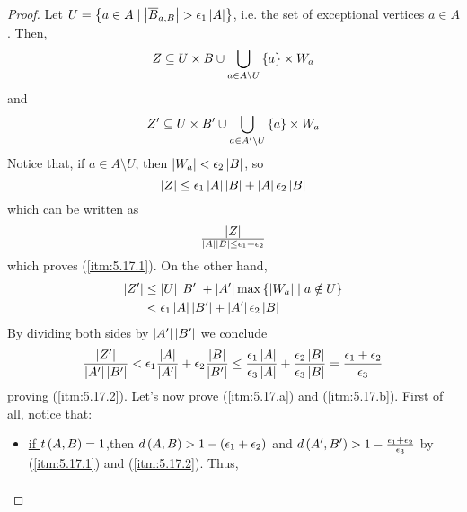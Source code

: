         \begin{proof}
            Let $U = \left\{ a \in A \mid \left| \overline{B}_{a,B} \right| > \epsilon_1 \left| A \right| \right\}$, i.e. the set
            of exceptional vertices $a \in A$.
            Then,
            \[
                Z \subseteq U \times B \cup \bigcup_{a \in A \setminus U} \left\{ a \right\} \times W_a
            \]
            and
            \[
                Z' \subseteq U \times B' \cup \bigcup_{a \in A' \setminus U} \left\{ a \right\} \times W_a
            \]
            Notice that, if $a \in A \setminus U$, then $\left| W_a \right| < \epsilon_2 \left| B \right|$, so
            \[
                \left| Z \right| \leq \epsilon_1 \left| A \right| \left| B \right| + \left| A \right| \epsilon_2 \left| B \right|
            \]
            which can be written as
            \[
                    {\left| Z \right|} \over {\left| A \right| \left| B \right|} \leq \epsilon_1 + \epsilon_2
            \]
            which proves (\ref{itm:5.17.1}).
            On the other hand,
            \begin{align*}
                \left| Z' \right| & \leq \left| U \right| \left| B' \right| + \left| A' \right| \max \left\{ \left| W_a \right| \mid a \notin U \right\} \\
                                 & < \epsilon_1 \left| A \right| \left| B' \right| + \left| A' \right| \epsilon_2 \left| B \right|
            \end{align*}
            By dividing both sides by $\left| A' \right| \left| B' \right|$ we conclude
            \[
                {\left| Z' \right| \over \left| A' \right| \left| B' \right|} < \epsilon_1 \frac{\left| A \right|}{\left| A' \right|} + \epsilon_2 \frac{\left| B \right|}{\left| B' \right|}
                \leq {{\epsilon_1 \left| A \right|} \over {\epsilon_3 \left| A \right|}} + {{\epsilon_2 \left| B \right|} \over {\epsilon_3 \left| B \right|}}
                = {{\epsilon_1 + \epsilon_2} \over \epsilon_3}
            \]
            proving (\ref{itm:5.17.2}).
            Let's now prove (\ref{itm:5.17.a}) and (\ref{itm:5.17.b}).
            First of all, notice that:
            \begin{itemize}
                \item \underline{if $t\left( A,B \right) = 1$},then $d\left( A,B \right) > 1 - \left( \epsilon_1 + \epsilon_2 \right)$
                    and $d \left( A',B' \right) > 1 - {{\epsilon_1 + \epsilon_2} \over \epsilon_3}$ by (\ref{itm:5.17.1}) and
                    (\ref{itm:5.17.2}).
                    Thus,
                    \begin{align*}

\end{align*}
\end{itemize}
\end{proof}
